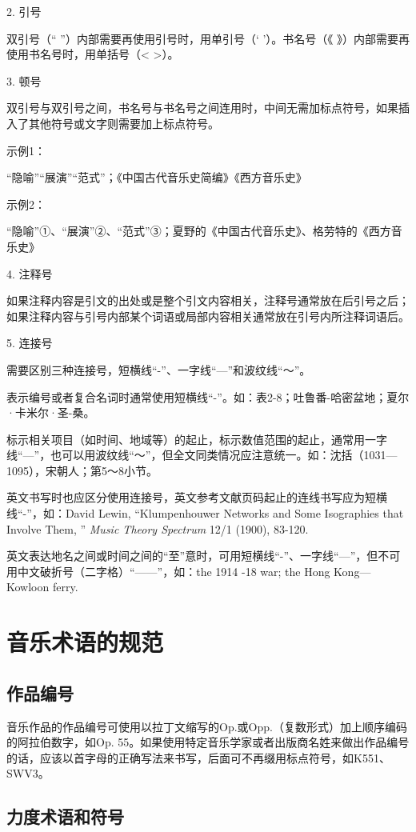 2. 引号

双引号（“ ”）内部需要再使用引号时，用单引号（‘ ’）。书名号（《 》）内部需要再使用书名号时，用单括号（< >）。

3. 顿号

双引号与双引号之间，书名号与书名号之间连用时，中间无需加标点符号，如果插入了其他符号或文字则需要加上标点符号。

示例1：

“隐喻”“展演”“范式”；《中国古代音乐史简编》《西方音乐史》

示例2：

“隐喻”①、“展演”②、“范式”③；夏野的《中国古代音乐史》、格劳特的《西方音乐史》

4. 注释号

如果注释内容是引文的出处或是整个引文内容相关，注释号通常放在后引号之后；如果注释内容与引号内部某个词语或局部内容相关通常放在引号内所注释词语后。

5. 连接号

需要区别三种连接号，短横线“-”、一字线“—”和波纹线“～”。

表示编号或者复合名词时通常使用短横线“-”。如：表2-8；吐鲁番-哈密盆地；夏尔·卡米尔·圣-桑。

标示相关项目（如时间、地域等）的起止，标示数值范围的起止，通常用一字线“—”，也可以用波纹线“～”，但全文同类情况应注意统一。如：沈括（1031—1095），宋朝人；第5～8小节。

英文书写时也应区分使用连接号，英文参考文献页码起止的连线书写应为短横线“-”，如：David Lewin, “Klumpenhouwer Networks and Some Isographies that Involve Them, ” \textit{Music Theory Spectrum} 12/1 (1900), 83-120.

英文表达地名之间或时间之间的“至”意时，可用短横线“-”、一字线“—”，但不可用中文破折号（二字格）“——”，如：the 1914 -18 war; the Hong Kong—Kowloon ferry.

\section{音乐术语的规范}

\subsection{作品编号}

音乐作品的作品编号可使用以拉丁文缩写的Op.或Opp.（复数形式）加上顺序编码的阿拉伯数字，如Op. 55。如果使用特定音乐学家或者出版商名姓来做出作品编号的话，应该以首字母的正确写法来书写，后面可不再缀用标点符号，如K551、SWV3。

\subsection{力度术语和符号}

